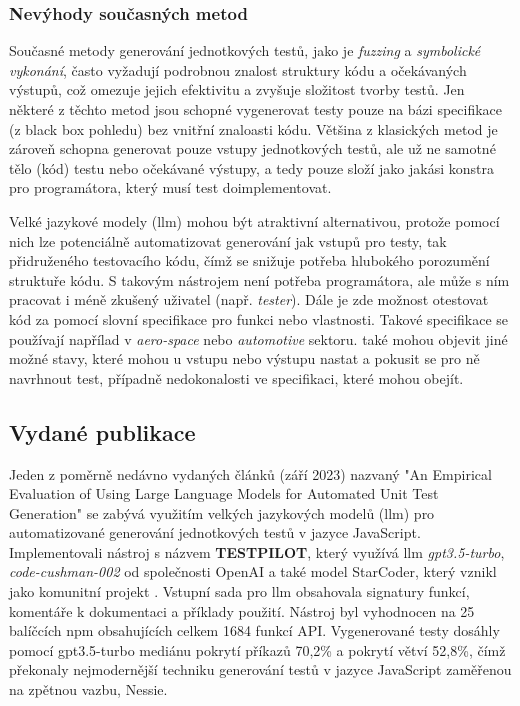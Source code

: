 \documentclass[czech, ma, kiv, he, iso690alph, pdf, viewonly]{fasthesis}
\begin{document}
        \subsubsection{Nevýhody současných metod}
        Současné metody generování jednotkových testů, jako je \textit{fuzzing} a \textit{symbolické vykonání}, často vyžadují podrobnou znalost struktury kódu a očekávaných výstupů, což omezuje jejich efektivitu a zvyšuje složitost tvorby testů. Jen některé z těchto metod jsou schopné vygenerovat testy pouze na bázi specifikace (z black box pohledu) bez vnitřní znaloasti kódu. Většina z klasických metod je zároveň schopna generovat pouze vstupy jednotkových testů, ale už ne samotné tělo (kód) testu nebo očekávané výstupy, a tedy pouze složí jako jakási konstra pro programátora, který musí test doimplementovat.

        Velké jazykové modely (\gls{llm}) mohou být atraktivní alternativou, protože pomocí nich lze potenciálně automatizovat generování jak vstupů pro testy, tak přidruženého testovacího kódu, čímž se snižuje potřeba hlubokého porozumění struktuře kódu. S takovým nástrojem není potřeba programátora, ale může s ním pracovat i méně zkušený uživatel (např. \textit{tester}). Dále je zde možnost otestovat kód za pomocí slovní specifikace pro funkci nebo vlastnosti. Takové specifikace se používají napřílad v \textit{aero-space} nebo \textit{automotive} sektoru. \cite{KuglerMaag2024SysReqAnalysis}  také mohou objevit jiné možné stavy, které mohou u vstupu nebo výstupu nastat a pokusit se pro ně navrhnout test, případně nedokonalosti ve specifikaci, které mohou obejít.

    \subsection{Vydané publikace}
    Jeden z poměrně nedávno vydaných článků (září 2023) nazvaný "An Empirical Evaluation of Using Large Language Models for Automated Unit Test Generation" \cite{schafer2023empirical} se zabývá využitím velkých jazykových modelů (\gls{llm}) pro automatizované generování jednotkových testů v jazyce JavaScript. Implementovali nástroj s názvem \textbf{TESTPILOT}, který využívá \gls{llm} \textit{gpt3.5-turbo}, \textit{code-cushman-002} od společnosti OpenAI a  také model StarCoder, který vznikl jako komunitní projekt \cite{StarCoder2023}. Vstupní sada pro \gls{llm} obsahovala signatury funkcí, komentáře k dokumentaci a příklady použití. Nástroj byl vyhodnocen na 25 balíčcích npm obsahujících celkem 1684 funkcí API. Vygenerované testy dosáhly pomocí gpt3.5-turbo mediánu pokrytí příkazů 70,2\% a pokrytí větví 52,8\%, čímž překonaly nejmodernější techniku generování testů v jazyce JavaScript zaměřenou na zpětnou vazbu, Nessie.
\end{document}
